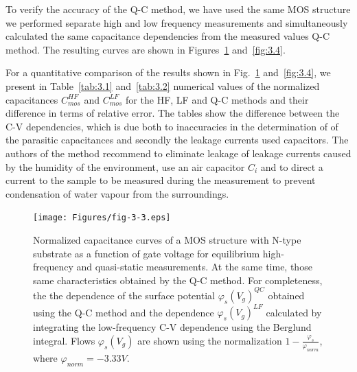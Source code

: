 To verify the accuracy of the Q-C method, we have used the same MOS
structure we performed separate high and low frequency measurements
and simultaneously calculated the same capacitance dependencies from
the measured values Q-C method.  The resulting curves are shown in
Figures~\ref{fig:3.3} and~\ref{fig:3.4}.

For a quantitative comparison of the results shown in
Fig.~\ref{fig:3.3} and~\ref{fig:3.4}, we present in
Table~\ref{tab:3.1} and~\ref{tab:3.2} numerical values of the
normalized capacitances $C^{HF}_{mos}$ and $C^{LF}_{mos}$ for the HF,
LF and Q-C methods and their difference in terms of relative
error. The tables show the difference between the C-V dependencies,
which is due both to inaccuracies in the determination of of the
parasitic capacitances and secondly the leakage currents used
capacitors. The authors of the method recommend to eliminate leakage
of leakage currents caused by the humidity of the environment, use an
air capacitor $C_i$ and to direct a current to the sample to be
measured during the measurement to prevent condensation of water
vapour from the surroundings.

\newpage
\begin{figure}[h!]\centering
  \texttt{[image: Figures/fig-3-3.eps]}
  \caption[Normalized capacitance curves of MOS structure with substrate type
  N as a function of gate voltage for equilibrium high-frequency and
  quasi-static measurements]{Normalized capacitance curves of a MOS structure with
  N-type substrate as a function of gate voltage for equilibrium
  high-frequency and quasi-static measurements.  At the same time, those
  same characteristics obtained by the Q-C method. For completeness, the
  the dependence of the surface potential
  ${\varphi_s(V_g)}^{QC}$ obtained using the Q-C method and the dependence
  ${\varphi_s(V_g)}^{LF}$ calculated by integrating the low-frequency C-V
  dependence using the Berglund integral.  Flows
  $\varphi_s(V_g)$ are shown using the normalization $1-\frac{\varphi_s}{\varphi_{norm}}$, where $\varphi_{norm}=-3.33V$.}\label{fig:3.3}
\end{figure}

